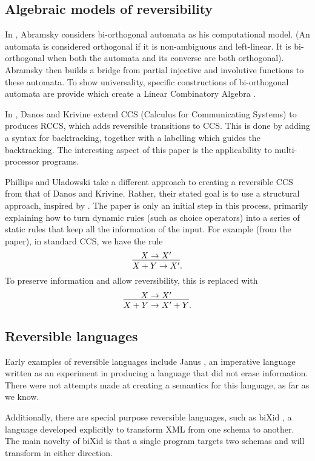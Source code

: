 \subsection{Algebraic models of reversibility}
\label{subsec:algebraic_models_of_reversibility}
In \cite{abramsky05:reversible}, Abramsky considers bi-orthogonal automata as his computational
model. (An automata is considered orthogonal if it is non-ambiguous and left-linear. It is
bi-orthogonal when both the automata and its converse are both orthogonal). Abramsky then builds a
bridge from partial injective and involutive functions to these automata. To show universality,
specific constructions of bi-orthogonal automata are provide which create a Linear Combinatory Algebra
\cite{abramsky02:GOI}.

In \cite{danos2004reversible}, Danos and Krivine extend CCS (Calculus for Communicating Systems)
\cite{milner1980calculus,milner1989communication} to produces RCCS, which adds reversible
transitions to CCS. This is done by adding a syntax for backtracking, together with a labelling
which guides the backtracking. The interesting aspect of this paper is the applicability to
multi-processor programs.

Phillips and Uladowski \cite{phillips2006operational} take a different approach to creating a
reversible CCS from that of Danos and Krivine. Rather, their stated goal is to use a structural
approach, inspired by \cite{abramsky05:reversible}. The paper is only an initial step in this
process, primarily explaining how to turn dynamic rules (such as choice operators) into a series of
static rules that keep all the information of the input. For example (from the paper), in standard
CCS, we have the rule
\[
  \infer{X+Y \to X'}{X\to X'}.
\]
To preserve information and allow reversibility, this is replaced with
\[
  \infer{X+Y \to X' +Y}{X\to X'}.
\]


\subsection{Reversible languages}
\label{subsec:reversible_languages}

Early examples of reversible languages include Janus \cite{lutz1986janus}, an imperative language
written as an experiment in producing a language that did not erase information. There were not
attempts made at creating a semantics for this language, as far as we know.

Additionally, there are special purpose reversible languages, such as biXid \cite{bixid06}, a
language developed explicitly to transform XML \cite{xml} from one schema to another. The main
novelty of biXid is that a single program targets two schemas and will transform in either direction.

